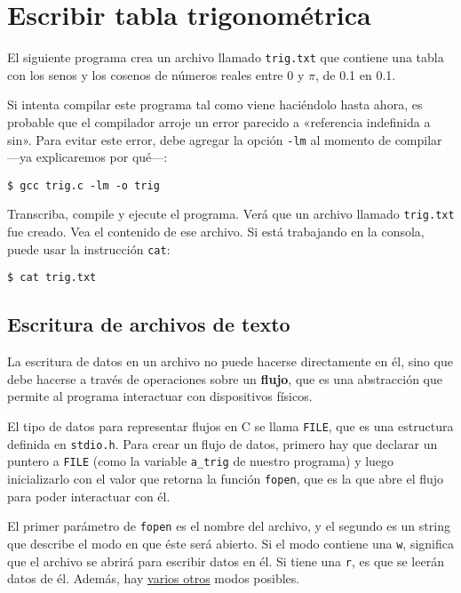 \chapter{Escribir tabla trigonométrica}

El siguiente programa crea un archivo llamado \lstinline!trig.txt! que
contiene una tabla con los senos y los cosenos de números reales entre 0
y \(\pi\), de 0.1 en 0.1.

Si intenta compilar este programa tal como viene haciéndolo hasta ahora,
es probable que el compilador arroje un error parecido a «referencia
indefinida a sin». Para evitar este error, debe agregar la opción
\lstinline!-lm! al momento de compilar ---ya explicaremos por qué---:

\begin{lstlisting}
$ gcc trig.c -lm -o trig
\end{lstlisting}

Transcriba, compile y ejecute el programa. Verá que un archivo llamado
\lstinline!trig.txt! fue creado. Vea el contenido de ese archivo. Si
está trabajando en la consola, puede usar la instrucción
\lstinline!cat!:

\begin{lstlisting}
$ cat trig.txt
\end{lstlisting}

\section{Escritura de archivos de texto}

La escritura de datos en un archivo no puede hacerse directamente en él,
sino que debe hacerse a través de operaciones sobre un \textbf{flujo},
que es una abstracción que permite al programa interactuar con
dispositivos físicos.

El tipo de datos para representar flujos en C se llama \lstinline!FILE!,
que es una estructura definida en \lstinline!stdio.h!. Para crear un
flujo de datos, primero hay que declarar un puntero a \lstinline!FILE!
(como la variable \lstinline!a_trig! de nuestro programa) y luego
inicializarlo con el valor que retorna la función \lstinline!fopen!, que
es la que abre el flujo para poder interactuar con él.

El primer parámetro de \lstinline!fopen! es el nombre del archivo, y el
segundo es un string que describe el modo en que éste será abierto. Si
el modo contiene una \lstinline!w!, significa que el archivo se abrirá
para escribir datos en él. Si tiene una \lstinline!r!, es que se leerán
datos de él. Además, hay
\href{http://c.conclase.net/librerias/?ansifun=fopen}{varios otros}
modos posibles.

